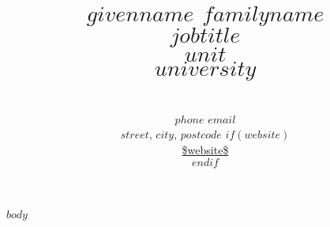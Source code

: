\documentclass[11pt, legal]{article}
\title{{\huge\bfseries $givenname$ $familyname$}\\[0.1in]{\normalsize {\bfseries $jobtitle$}\\$unit$\\[-0.1in]$university$}} %
\date{} %
\author{\\[-0.40in]{\normalsize $phone$ \hspace{0.35in} $email$}\\ %
{\normalsize $street$, $city$, $postcode$} %
$if(website)$\\{\normalsize \url{$website$}}\\$endif$ } %
\begin{document}
\newlength{\backupparskip}
\setlength{\backupparskip}{\parskip}
\setlength{\parskip}{0pt}
\maketitle
\begin{raggedright}
	\vspace{-0.25in}
	\thispagestyle{empty}
	\setlength{\parskip}{\backupparskip}
	\vspace{-0.5in}
	$body$
\end{raggedright}
\end{document}
